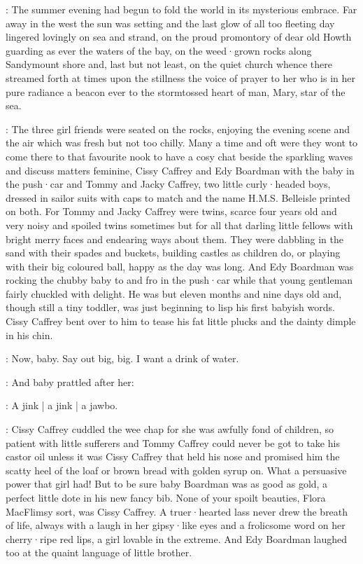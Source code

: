 :
The summer evening
had begun to fold the world
in its mysterious embrace.
Far away in the west
the sun was setting
and the last glow of all too fleeting day
lingered lovingly on sea and strand,
on the proud promontory
of dear old Howth
guarding as ever
the waters of the bay,
on the weed·grown rocks along Sandymount shore
and, last but not least,
on the quiet church
whence there streamed forth at times
upon the stillness
the voice of prayer
to her
who is in her pure radiance
a beacon ever
to the stormtossed heart of man,
Mary,
star of the sea.

:
The three girl friends were seated on the rocks,
enjoying the evening scene
and the air
which was fresh but not too chilly.
Many a time and oft
were they wont to come there
to that favourite nook
to have a cosy chat
beside the sparkling waves
and discuss matters feminine,
Cissy Caffrey
and Edy Boardman with the baby in the push·car
and Tommy and Jacky Caffrey,
two little curly·headed boys,
dressed in sailor suits
with caps to match
and the name H.M.S. Belleisle printed on both.
For Tommy and Jacky Caffrey were twins,
scarce four years old
and very noisy and spoiled twins sometimes
but for all that
darling little fellows
with bright merry faces and endearing ways about them.
They were dabbling in the sand
with their spades and buckets,
building castles as children do,
or playing with their big coloured ball,
happy as the day was long.
And Edy Boardman was rocking the chubby baby
to and fro in the push·car
while that young gentleman
fairly chuckled with delight.
He was but eleven months and nine days old
and,
though still a tiny toddler,
was just beginning to lisp his first babyish words.
Cissy Caffrey bent over to him
to tease his fat little plucks
and the dainty dimple in his chin.

\cissy:
Now,
baby.
Say out big,
big.
I want a drink of water.

:
And baby prattled after her:

\baby:
A jink |
a jink |
a jawbo.

:
Cissy Caffrey cuddled the wee chap
for she was awfully fond of children,
so patient with little sufferers
and Tommy Caffrey could never be got to take his castor oil
unless it was Cissy Caffrey that held his nose
and promised him the scatty heel of the loaf
or brown bread with golden syrup on.
What a persuasive power that girl had!
But to be sure
baby Boardman was as good as gold,
a perfect little dote in his new fancy bib.
None of your spoilt beauties,
Flora MacFlimsy sort,
was Cissy Caffrey.
A truer·hearted lass never drew the breath of life,
always with a laugh in her gipsy·like eyes
and a frolicsome word on her cherry·ripe red lips,
a girl lovable in the extreme.
And Edy Boardman laughed too
at the quaint language of little brother.


